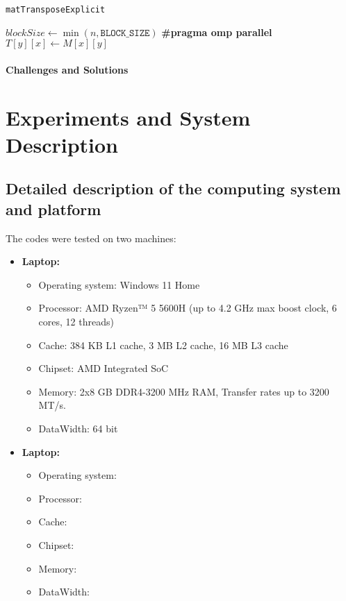 \documentclass[conference]{IEEEtran}
\begin{document}
\begin{algorithm} \caption{\texttt{matTransposeExplicit}} \begin{algorithmic}[1] \State $blockSize \gets \min(n, \texttt{BLOCK\_SIZE})$ \State \textbf{\#pragma omp parallel}     \State $T[y][x] \gets M[x][y]$ \EndFor \EndFor \EndFor \EndFor \end{algorithmic} \end{algorithm}

\paragraph{Challenges and Solutions}

\begin{itemize} 

\end{itemize}

\section{Experiments and System Description}
\subsection{Detailed description of the computing system and platform}
The codes were tested on two machines:
\begin{itemize} \item \textbf{Laptop:}
\begin{itemize} \item Operating system: Windows 11 Home
 \item Processor: AMD Ryzen™ 5 5600H (up to 4.2 GHz max boost clock, 6 cores, 12 threads)
 \item Cache: 384 KB L1 cache, 3 MB L2 cache, 16 MB L3 cache
 \item Chipset: AMD Integrated SoC
\item Memory: 2x8 GB DDR4-3200 MHz RAM, Transfer rates up to 3200 MT/s.
\item DataWidth: 64 bit
\end{itemize}
 \item \textbf{Laptop:}
\begin{itemize} \item Operating system: 
 \item Processor: 
 \item Cache: 
 \item Chipset: 
\item Memory: 
\item DataWidth: 
\end{itemize}
\end{itemize}
\end{document}
